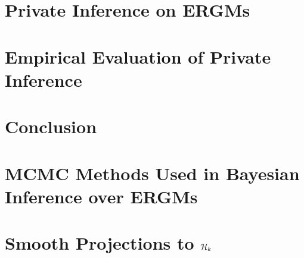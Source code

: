 \documentclass[12pt]{report}
\begin{document}
	
	\chapter{Private Inference on ERGMs}\label{ch:dp_stats}
	
	
	
	
	\chapter{Empirical Evaluation of Private Inference}\label{ch:experiments}
	
	
	
	\chapter{Conclusion}\label{conclusion}
	
	
	\cleardoublepage
	
	\nocite{*}
	\printbibliography	
	
	
		
		\appendix
		
		\chapter{MCMC Methods Used in Bayesian Inference over ERGMs}\label{appendix_mcmc}
		
		
		
		\chapter{Smooth Projections to $\mathcal{H}_k$}\label{appendix_projections}
		
		
	
\end{document}
